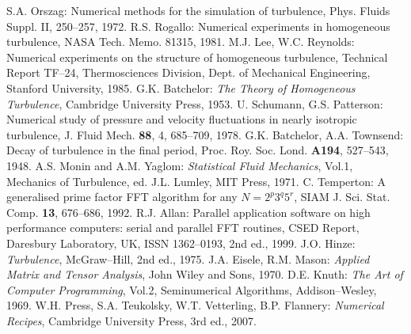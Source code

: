 \documentclass[dvips]{article}
\begin{document}
\newpage
\begin{thebibliography}{99}
S.A. Orszag: Numerical methods for the simulation of
turbulence, Phys. Fluids Suppl. II, 250--257, 1972.
R.S. Rogallo: Numerical experiments in homogeneous
turbulence, NASA Tech. Memo. 81315, 1981.
M.J. Lee, W.C. Reynolds: Numerical experiments on
the structure of homogeneous turbulence, Technical Report TF--24,
Thermosciences Division, Dept. of Mechanical Engineering, Stanford University,
1985.
G.K. Batchelor: {\it The Theory of Homogeneous
Turbulence}, Cambridge University Press, 1953.
U. Schumann, G.S. Patterson: Numerical study of pressure
and velocity fluctuations in nearly isotropic turbulence, J. Fluid Mech.
{\bf 88}, 4, 685--709, 1978.
G.K. Batchelor, A.A. Townsend: Decay of
turbulence in the final period, Proc. Roy. Soc. Lond. {\bf A194}, 527--543,
1948.
A.S. Monin and A.M. Yaglom: {\it Statistical Fluid
Mechanics}, Vol.1, Mechanics of Turbulence, ed. J.L. Lumley, MIT
Press, 1971.
C. Temperton: A generalised prime factor FFT
algorithm for any $N=2^{p}3^{q}5^{r}$, SIAM J. Sci. Stat. Comp. {\bf 13},
676--686, 1992.
R.J. Allan:  Parallel application software on high
performance computers: serial and parallel FFT routines, CSED Report,
Daresbury Laboratory, UK, ISSN 1362--0193, 2nd ed., 1999.
J.O. Hinze: {\it Turbulence}, McGraw--Hill, 2nd ed., 1975.
J.A. Eisele, R.M. Mason: {\it Applied Matrix and Tensor
Analysis}, John Wiley and Sons, 1970.
D.E. Knuth: {\it The Art of Computer Programming}, Vol.2,
Seminumerical Algorithms, Addison--Wesley, 1969.
W.H. Press, S.A. Teukolsky, W.T. Vetterling, B.P. Flannery:
{\it Numerical Recipes}, Cambridge University Press, 3rd ed., 2007.
\end{thebibliography}
\end{document}
